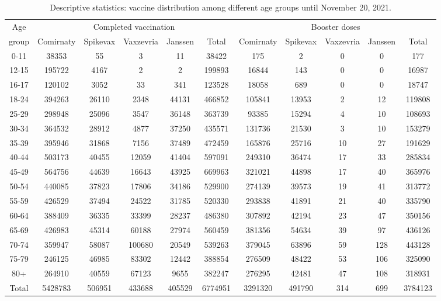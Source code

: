 \documentclass[preprint,12pt,authoryear]{elsarticle}
\begin{document}
\begin{sidewaystable}[h]
\caption{Descriptive statistics: vaccine distribution among different age groups until November 20, 2021.  \vspace{2mm}}
\label{description2}
\begin{tabular}{c|ccccc|ccccc}
\hline
Age & \multicolumn{5}{c|}{Completed vaccination} & 
\multicolumn{5}{c}{Booster doses} \\
group & Comirnaty & Spikevax & Vaxzevria & Janssen & Total
& Comirnaty & Spikevax & Vaxzevria & Janssen & Total \\ \hline
0-11&38353&55&3&11&38422&175&2&0&0&177\\
12-15&195722&4167&2&2&199893&16844&143&0&0&16987\\
16-17&120102&3052&33&341&123528&18058&689&0&0&18747\\
18-24&394263&26110&2348&44131&466852&105841&13953&2&12&119808\\
25-29&298948&25096&3547&36148&363739&93385&15294&4&10&108693\\
30-34&364532&28912&4877&37250&435571&131736&21530&3&10&153279\\
35-39&395946&31868&7156&37489&472459&165876&25716&10&27&191629\\
40-44&503173&40455&12059&41404&597091&249310&36474&17&33&285834\\
45-49&564756&44639&16643&43925&669963&321021&44898&17&40&365976\\
50-54&440085&37823&17806&34186&529900&274139&39573&19&41&313772\\
55-59&426529&37494&24522&31785&520330&293838&41891&21&40&335790\\
60-64&388409&36335&33399&28237&486380&307892&42194&23&47&350156\\
65-69&426983&45314&60188&27974&560459&381356&54634&39&97&436126\\
70-74&359947&58087&100680&20549&539263&379045&63896&59&128&443128\\
75-79&246125&46985&83302&12442&388854&276509&48422&53&106&325090\\
80+&264910&40559&67123&9655&382247&276295&42481&47&108&318931\\
\hline
Total&5428783&506951&433688&405529&6774951&3291320&491790&314&699&3784123\\
\hline
\end{tabular}
\end{sidewaystable}
\end{document}
